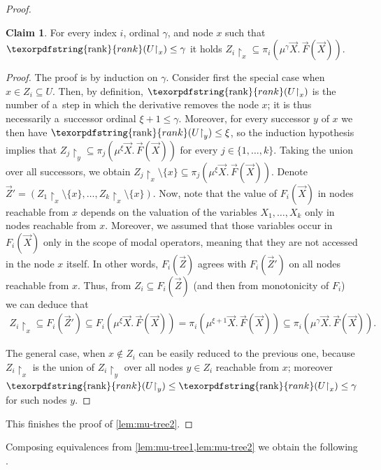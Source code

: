 \documentclass[11pt,a4paper]{amsart}
\theoremstyle{plain}
\theoremstyle{definition}
\newtheorem{clm}[thm]{Claim}
\theoremstyle{defC}
\theoremstyle{thmC}
\theoremstyle{plain}
\numberwithin{equation}{section}
\numberwithin{equation}{section}
\numberwithin{figure}{section}
\newcommand{\ident}[1]{\ensuremath{\texorpdfstring{\mathrm{\mathnm{#1}}}{#1}}\xspace}
\newcommand{\mathnm}[1]{#1}
\newcommand{\restr}{{\upharpoonright}}
\newcommand{\rank}{\ident{rank}}
\begin{document}
\begin{proof}
	\begin{clm}
		For every index $i$, ordinal $\gamma$, and node $x$ such that $\rank(U\restr_x)\leq\gamma$ it holds $Z_i\restr_x\subseteq\pi_i(\mu^\gamma\vec{X}.\,\vec{F}(\vec{X}))$.
	\end{clm}

	\begin{proof}
		The proof is by induction on $\gamma$.
		Consider first the special case when $x\in Z_i\subseteq U$.
		Then, by definition, $\rank(U\restr_x)$ is the number of a~step in which the derivative removes the node $x$; it is thus necessarily a~successor ordinal $\xi+1\leq\gamma$.
		Moreover, for every successor $y$ of $x$ we then have $\rank(U\restr_y)\leq\xi$,
		so the induction hypothesis implies that $Z_j\restr_y\subseteq\pi_j(\mu^{\xi}\vec{X}.\,\vec{F}(\vec{X}))$ for every $j\in\{1,\dots,k\}$.
		Taking the union over all successors, we obtain $Z_j\restr_x\setminus\{x\}\subseteq\pi_j(\mu^{\xi}\vec{X}.\,\vec{F}(\vec{X}))$.
		Denote $\vec{Z}'=(Z_1\restr_x\setminus\{x\},\dots,Z_k\restr_x\setminus\{x\})$.
		Now, note that the value of $F_i(\vec{X})$ in nodes reachable from $x$ depends on the valuation of the variables $X_1,\dots,X_k$ only in nodes reachable from $x$.
		Moreover, we assumed that those variables occur in $F_i(\vec{X})$ only in the scope of modal operators, meaning that they are not accessed in the node $x$ itself.
		In other words, $F_i(\vec{Z})$ agrees with $F_i(\vec{Z}')$ on all nodes reachable from $x$.
		Thus, from $Z_i\subseteq F_i(\vec{Z})$ (and then from monotonicity of $F_i$) we can deduce that
		\begin{align*}
			Z_i\restr_x\subseteq F_i(\vec{Z}')\subseteq F_i(\mu^{\xi}\vec{X}.\,\vec{F}(\vec{X}))=\pi_i(\mu^{\xi+1}\vec{X}.\,\vec{F}(\vec{X}))\subseteq\pi_i(\mu^\gamma\vec{X}.\,\vec{F}(\vec{X})).
		\end{align*}
		
		The general case, when $x\not\in Z_i$ can be easily reduced to the previous one,
		because $Z_i\restr_x$ is the union of $Z_i\restr_y$ over all nodes $y\in Z_i$ reachable from $x$;
		moreover $\rank(U\restr_y)\leq\rank(U\restr_x)\leq\gamma$ for such nodes $y$.
	\end{proof}

	This finishes the proof of \cref{lem:mu-tree2}.
\end{proof}

Composing equivalences from \cref{lem:mu-tree1,lem:mu-tree2} we obtain the following .
\end{document}
